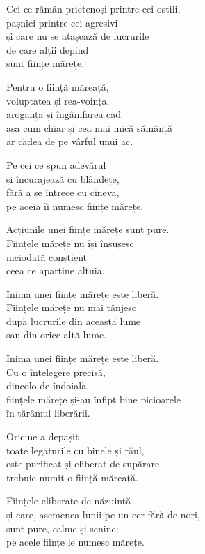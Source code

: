 Cei ce rămân prietenoși printre cei ostili,\\
pașnici printre cei agresivi\\
și care nu se atașează de lucrurile\\
de care alții depind\\
sunt ființe mărețe.


Pentru o ființă măreață,\\
voluptatea și rea-voința,\\
aroganța și îngâmfarea cad\\
așa cum chiar și cea mai mică sămânță\\
ar cădea de pe vârful unui ac.


Pe cei ce spun adevărul\\
și încurajează cu blândețe,\\
fără a se întrece cu cineva,\\
pe aceia îi numesc ființe mărețe.


Acțiunile unei ființe mărețe sunt pure.\\
Ființele mărețe nu își însușesc\\
niciodată conștient\\
ceea ce aparține altuia.

Inima unei ființe mărețe este liberă.\\
Ființele mărețe nu mai tânjesc\\
după lucrurile din această lume\\
sau din orice altă lume.


Inima unei ființe mărețe este liberă.\\
Cu o înțelegere precisă,\\
dincolo de îndoială,\\
ființele mărețe și-au înfipt bine picioarele\\
în tărâmul liberării.


Oricine a depășit\\
toate legăturile cu binele și răul,\\
este purificat și eliberat de supărare\\
trebuie numit o ființă măreață.


Ființele eliberate de năzuință\\
și care, asemenea lunii pe un cer fără de nori,\\
sunt pure, calme și senine:\\
pe acele ființe le numesc mărețe.


